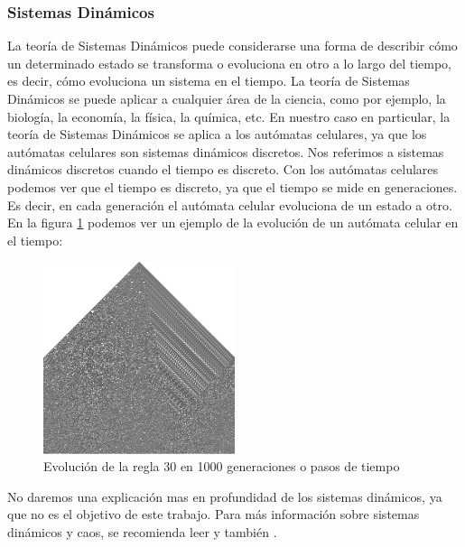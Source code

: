 \subsubsection{Sistemas Din\'amicos}
\label{sec:SistemasDinamicos}
    La teor\'ia de Sistemas Din\'amicos puede considerarse una forma de describir c\'omo un determinado estado
        se transforma o evoluciona en otro a lo largo del tiempo, es decir, c\'omo evoluciona un sistema en el tiempo.
        La teor\'ia de Sistemas Din\'amicos se puede aplicar a cualquier \'area de la ciencia, como por ejemplo,
        la biolog\'ia, la econom\'ia, la f\'isica, la qu\'imica, etc. En nuestro caso en particular, la teor\'ia de
        Sistemas Din\'amicos se aplica a los aut\'omatas celulares, ya que los aut\'omatas celulares son sistemas
        din\'amicos discretos.
    \vskip 0.5cm
    Nos referimos a sistemas din\'amicos discretos cuando el tiempo es discreto. Con los aut\'omatas celulares
        podemos ver que el tiempo es discreto, ya que el tiempo se mide en generaciones. Es decir, en cada generaci\'on
        el aut\'omata celular evoluciona de un estado a otro. En la figura \ref{fig:automataCelularEvolucion} podemos
        ver un ejemplo de la evoluci\'on de un aut\'omata celular en el tiempo:
        \begin{figure}[h]
            \centering
            \includegraphics[width=0.5\textwidth]{./images/marco_teorico/automatas_celulares/Regla30-1000Gen.png}
            \caption{Evoluci\'on de la regla 30 en 1000 generaciones o pasos de tiempo}
            \label{fig:automataCelularEvolucion}
        \end{figure}
    \vskip 0.5cm
    No daremos una explicaci\'on mas en profundidad de los sistemas din\'amicos, ya que no es el objetivo de este
        trabajo. Para m\'as informaci\'on sobre sistemas din\'amicos y caos, se recomienda leer \cite{Ott1993} y tambi\'en \cite{Luenberger1979}.
